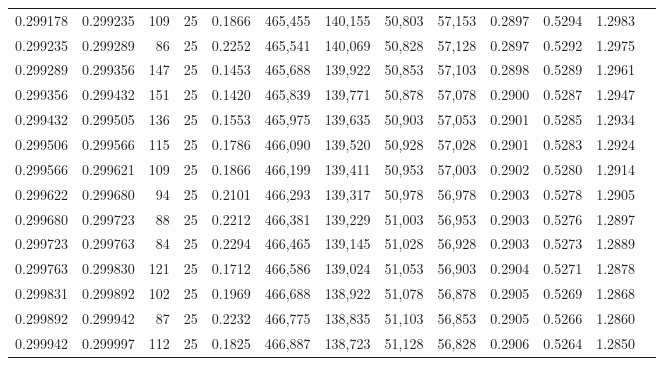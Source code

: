 \begin{tabular}{rrrrrrrrrrrrr}
0.299178 & 0.299235 &   109 &  25 &                                     0.1866 & 465,455 & 140,155 &  50,803 &  57,153 & 0.2897 & 0.5294 & 1.2983 \\
0.299235 & 0.299289 &    86 &  25 &                                     0.2252 & 465,541 & 140,069 &  50,828 &  57,128 & 0.2897 & 0.5292 & 1.2975 \\
0.299289 & 0.299356 &   147 &  25 &                                     0.1453 & 465,688 & 139,922 &  50,853 &  57,103 & 0.2898 & 0.5289 & 1.2961 \\
0.299356 & 0.299432 &   151 &  25 &                                     0.1420 & 465,839 & 139,771 &  50,878 &  57,078 & 0.2900 & 0.5287 & 1.2947 \\
0.299432 & 0.299505 &   136 &  25 &                                     0.1553 & 465,975 & 139,635 &  50,903 &  57,053 & 0.2901 & 0.5285 & 1.2934 \\
0.299506 & 0.299566 &   115 &  25 &                                     0.1786 & 466,090 & 139,520 &  50,928 &  57,028 & 0.2901 & 0.5283 & 1.2924 \\
0.299566 & 0.299621 &   109 &  25 &                                     0.1866 & 466,199 & 139,411 &  50,953 &  57,003 & 0.2902 & 0.5280 & 1.2914 \\
0.299622 & 0.299680 &    94 &  25 &                                     0.2101 & 466,293 & 139,317 &  50,978 &  56,978 & 0.2903 & 0.5278 & 1.2905 \\
0.299680 & 0.299723 &    88 &  25 &                                     0.2212 & 466,381 & 139,229 &  51,003 &  56,953 & 0.2903 & 0.5276 & 1.2897 \\
0.299723 & 0.299763 &    84 &  25 &                                     0.2294 & 466,465 & 139,145 &  51,028 &  56,928 & 0.2903 & 0.5273 & 1.2889 \\
0.299763 & 0.299830 &   121 &  25 &                                     0.1712 & 466,586 & 139,024 &  51,053 &  56,903 & 0.2904 & 0.5271 & 1.2878 \\
0.299831 & 0.299892 &   102 &  25 &                                     0.1969 & 466,688 & 138,922 &  51,078 &  56,878 & 0.2905 & 0.5269 & 1.2868 \\
0.299892 & 0.299942 &    87 &  25 &                                     0.2232 & 466,775 & 138,835 &  51,103 &  56,853 & 0.2905 & 0.5266 & 1.2860 \\
0.299942 & 0.299997 &   112 &  25 &                                     0.1825 & 466,887 & 138,723 &  51,128 &  56,828 & 0.2906 & 0.5264 & 1.2850 \\

\end{tabular}
